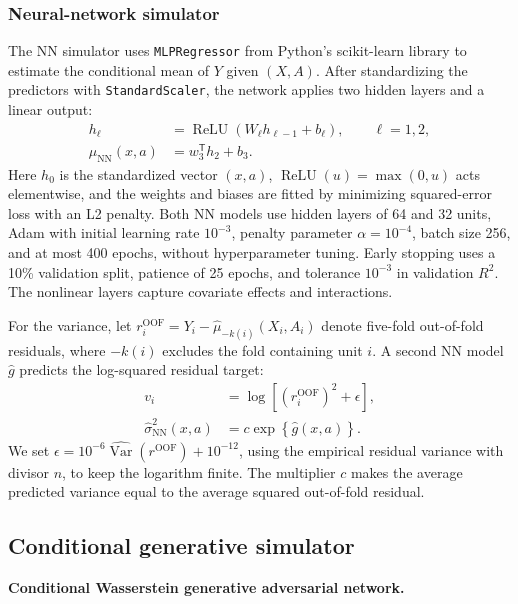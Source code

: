 \subsubsection{Neural-network simulator}

The NN simulator uses \texttt{MLPRegressor} from Python's scikit-learn library to estimate the conditional mean of \(Y\) given \((X,A)\). After standardizing the predictors with \texttt{StandardScaler}, the network applies two hidden layers and a linear output:
\[
\begin{aligned}
h_\ell &= \operatorname{ReLU}(W_\ell h_{\ell-1}+b_\ell),\qquad \ell=1,2,\\
\widehat\mu_{\mathrm{NN}}(x,a) &= w_3^{\mathsf T}h_2+b_3.
\end{aligned}
\]
Here \(h_0\) is the standardized vector \((x,a)\), \(\operatorname{ReLU}(u)=\max(0,u)\) acts elementwise, and the weights and biases are fitted by minimizing squared-error loss with an L2 penalty. Both NN models use hidden layers of 64 and 32 units, Adam with initial learning rate \(10^{-3}\), penalty parameter \(\alpha=10^{-4}\), batch size 256, and at most 400 epochs, without hyperparameter tuning. Early stopping uses a 10\% validation split, patience of 25 epochs, and tolerance \(10^{-3}\) in validation \(R^2\). The nonlinear layers capture covariate effects and interactions.

For the variance, let \(r_i^{\mathrm{OOF}}=Y_i-\widehat\mu_{-k(i)}(X_i,A_i)\) denote five-fold out-of-fold residuals, where \(-k(i)\) excludes the fold containing unit \(i\). A second NN model \(\widehat g\) predicts the log-squared residual target:
\[
\begin{aligned}
v_i &= \log\!\left[(r_i^{\mathrm{OOF}})^2+\epsilon\right],\\
\widehat\sigma_{\mathrm{NN}}^2(x,a) &= c\exp\!\left\{\widehat g(x,a)\right\}.
\end{aligned}
\]
We set \(\epsilon=10^{-6}\widehat{\operatorname{Var}}(r^{\mathrm{OOF}})+10^{-12}\), using the empirical residual variance with divisor \(n\), to keep the logarithm finite. The multiplier \(c\) makes the average predicted variance equal to the average squared out-of-fold residual.

\subsection{Conditional generative simulator}

\noindent\textbf{Conditional Wasserstein generative adversarial network.}

